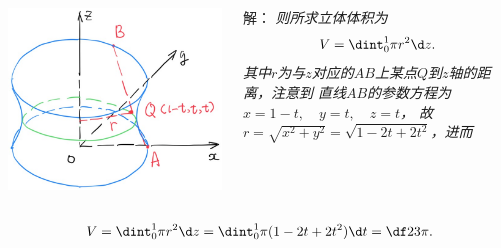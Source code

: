 \begin{frame}
	\linespread{1.5}
	\pause

	\small 
	\begin{columns}
		\begin{column}{.4\textwidth}
			\begin{center}
				\includegraphics[width=.9\textwidth]{./images/ch8/abzz.jpg}
			\end{center}
		\end{column}
		\begin{column}{.6\textwidth}
			解：\it
			则所求立体体积为
			$$V=\dint_0^1\pi r^2\d z.$$
			其中$r$为与$z$对应的$AB$上某点$Q$到$z$轴的距离，注意到
			直线$AB$的参数方程为
			$x=1-t,\quad y=t,\quad z=t$，
			故$r=\sqrt{x^2+y^2}=\sqrt{1-2t+2t^2}$，进而
		\end{column}
	\end{columns}
	$$V=\dint_0^1\pi r^2\d z
	=\dint_0^1\pi(1-2t+2t^2)\d t=\df23\pi.$$
	\fin
\end{frame}

